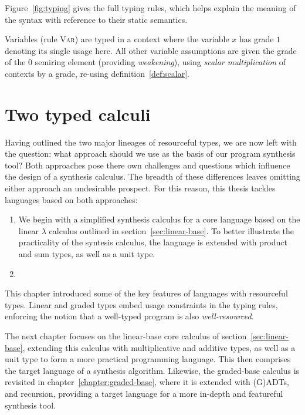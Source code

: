 Figure~\ref{fig:typing} gives the full typing rules, which helps explain the meaning of
the syntax with reference to their static semantics.

Variables (rule \textsc{Var}) are
typed in a context where the variable $x$ has grade $1$ denoting its
single usage here. All other variable assumptions are given the grade
of the $0$ semiring element (providing \emph{weakening}),
using \textit{scalar multiplication} of contexts by a grade, re-using definition~\eqref{def:scalar}.


\section{Two typed calculi}


Having outlined the two major lineages of resourceful types, we
are now left with the question: what approach should we use as the basis of our
program synthesis tool? Both approaches pose there own challenges and questions
which influence the design of a synthesis calculus. The breadth of these
differences leaves omitting either approach an undesirable prospect. For this
reason, this thesis tackles languages based on both approaches:

\begin{enumerate}
        \item We begin with a simplified synthesis calculus for a core language
        based on the linear $\lambda$ calculus outlined in
        section~\eqref{sec:linear-base}. To better illustrate the practicality
        of the syntesis calculus, the language is extended with product
        and sum types, as well as a unit type.
        \item
\end{enumerate}




This chapter introduced some of the key features of languages with resourceful
types. Linear and graded types embed usage constraints in the typing rules,
enforcing the notion that a well-typed program is also \textit{well-resourced}.

The next chapter focuses on the linear-base core calculus of
section~\ref{sec:linear-base}, extending this calculus with multiplicative and additive
types, as well as a unit type to form a more practical programming language. This
then comprises the target language of a synthesis algorithm. Likewise, the graded-base
calculus is revisited in chapter~\ref{chapter:graded-base}, where it is extended
with (G)ADTs, and recursion, providing a target language for a more in-depth and
featureful synthesis tool.

